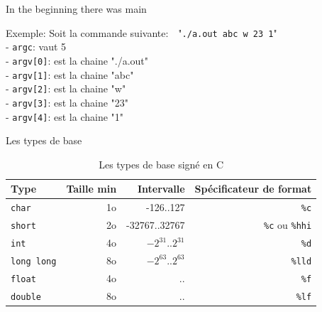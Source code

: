 \documentclass{beamer}
\begin{document}
\begin{darkframes}
  	\begin{frame}{In the beginning there was main}
	  	\begin{exampleblock}{Exemple:}
	  		Soit la commande suivante:~~"\texttt{./a.out abc w 23 1}" \\
	  		- \texttt{argc}: vaut 5 \\
	  		- \texttt{argv[0]}: est la chaine "./a.out" \\
	  		- \texttt{argv[1]}: est la chaine "abc" \\
	  		- \texttt{argv[2]}: est la chaine "w" \\
	  		- \texttt{argv[3]}: est la chaine "23" \\
	  		- \texttt{argv[4]}: est la chaine "1" \\
	  	\end{exampleblock}
  	\end{frame}
  
  	\begin{frame}{Les types de base}
  		\begin{table}[!b]
  			{\carlitoTLF %
  			\begin{tabularx}{\textwidth}{Xrrr}
  				\textbf{Type} & \textbf{Taille min} & \textbf{Intervalle} & \textbf{Spécificateur de format} \\
  				\toprule
  				\texttt{char}      & 1o  & -126..127  		   & \texttt{\%c}    				    \\
  				\texttt{short}     & 2o  & -32767..32767  	   & \texttt{\%c} ou \texttt{\%hhi}     \\
  				\texttt{int}       & 4o  & $-2^{31}$..$2^{31}$ & \texttt{\%d}    				    \\
  				\texttt{long long} & 8o  & $-2^{63}$..$2^{63}$ & \texttt{\%lld}  				    \\
  				\texttt{float}     & 4o  &    ..    		   & \texttt{\%f}    				    \\
  				\texttt{double}    & 8o  &    ..   			   & \texttt{\%lf}   					\\
  				\bottomrule
  			\end{tabularx}}
  			\caption{Les types de base signé en C}
  		\end{table}
  	\end{frame}
  

\end{darkframes}
\end{document}

